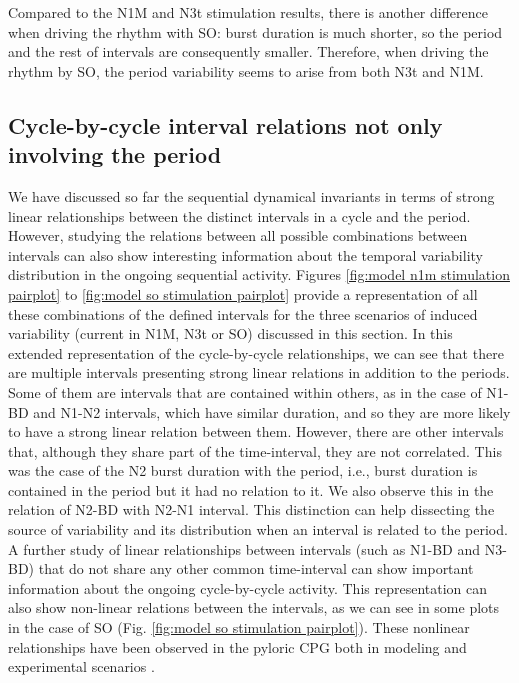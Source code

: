 
Compared to the N1M and N3t stimulation results, there is another difference when driving the rhythm with SO: burst duration is much shorter, so the period and the rest of intervals are consequently smaller. Therefore, when driving the rhythm by SO, the period variability seems to arise from both N3t and N1M. 



\subsection{Cycle-by-cycle interval relations not only involving the period}
We have discussed so far the sequential dynamical invariants in terms of strong linear relationships between the distinct intervals in a cycle and the period.  However, studying the relations between all possible combinations between intervals can also show interesting information about the temporal variability distribution in the ongoing sequential activity. Figures \ref{fig:model n1m stimulation pairplot} to \ref{fig:model so stimulation pairplot} provide a representation of all these combinations of the defined intervals for the three scenarios of induced variability (current in N1M, N3t or SO) discussed in this section. In this extended representation of the cycle-by-cycle relationships, we can see that there are multiple intervals presenting strong linear relations in addition to the periods. Some of them are intervals that are contained within others, as in the case of N1-BD and N1-N2 intervals, which have similar duration, and so they are more likely to have a strong linear relation between them. However, there are other intervals that, although they share part of the time-interval, they are not correlated. This was the case of the N2 burst duration with the period, i.e., burst duration is contained in the period but it had no relation to it. We also observe this in the relation of N2-BD with N2-N1 interval. This distinction can help dissecting the source of variability and its distribution when an interval is related to the period. A further study of linear relationships between  intervals (such as N1-BD and N3-BD) that do not share any other common time-interval can show important information about the ongoing cycle-by-cycle activity. This representation can also show non-linear relations between the intervals, as we can see in some plots in the case of SO (Fig. \ref{fig:model so stimulation pairplot}). These nonlinear relationships have been observed in the pyloric CPG both in modeling and experimental scenarios \parencite{berbel_emergence_2024}.

